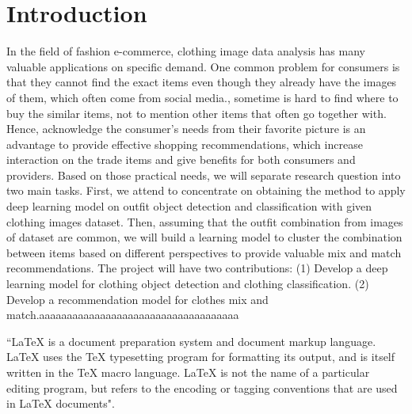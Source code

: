 \section{Introduction}
In the field of fashion e-commerce, clothing image data analysis has many valuable applications on specific demand. One common problem for consumers is that they cannot find the exact items even though they already have the images of them, which often come from social media., sometime is hard to find where to buy the similar items, not to mention other items that often go together with. Hence, acknowledge the consumer’s needs from their favorite picture is an advantage to provide effective shopping recommendations, which increase interaction on the trade items and give benefits for both consumers and providers. 
Based on those practical needs, we will separate research question into two main tasks. First, we attend to concentrate on obtaining the method to apply deep learning model on outfit object detection and classification with given clothing images dataset. Then, assuming that the outfit combination from images of dataset are common, we will build a learning model to cluster the combination between items based on different perspectives to provide valuable mix and match recommendations.
The project will have two contributions: (1) Develop a deep learning model for clothing object detection and clothing classification. (2) Develop a recommendation model for clothes mix and match.aaaaaaaaaaaaaaaaaaaaaaaaaaaaaaaaaaaa

\begin{flushleft}
``LaTeX is a document preparation system and document markup 
language. LaTeX uses the TeX typesetting program for formatting 
its output, and is itself written in the TeX macro language. 
LaTeX is not the name of a particular editing program, but refers 
to the encoding or tagging conventions that are used in LaTeX documents".
\end{flushleft}